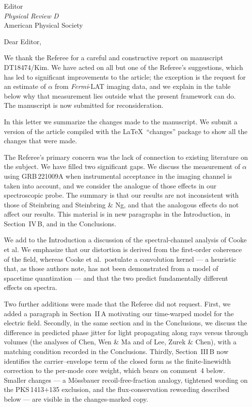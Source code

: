 \documentclass[12pt]{letter}
\begin{document}
\begin{letter}{Editor\\
\textit{Physical Review D}\\
American Physical Society}

\opening{Dear Editor,}

We thank the Referee for a careful and constructive report on manuscript
DT18474/Kim.  We have acted on all but one of the Referee's suggestions,
which has led to significant improvements to the article; the exception is
the request for an estimate of $\alpha$ from \textit{Fermi}-LAT imaging data,
and we explain in the table below why that measurement lies outside what the
present framework can do.  The manuscript is now submitted for
reconsideration.

In this letter we summarize the changes made to the manuscript.  We submit a
version of the article compiled with the \LaTeX\ ``changes'' package to show
all the changes that were made.

The Referee's primary concern was the lack of connection to existing
literature on the subject.  We have filled two significant gaps.  We discuss
the measurement of $\alpha$ using GRB\,221009A when instrumental acceptance
in the imaging channel is taken into account, and we consider the analogue of
those effects in our spectroscopic probe.  The summary is that our results
are not inconsistent with those of Steinbring and Steinbring \& Ng, and that
the analogous effects do not affect our results.  This material is in new
paragraphs in the Introduction, in Section~IV\,B, and in the Conclusions.

We add to the Introduction a discussion of the spectral-channel analysis of
Cooke et al.  We emphasize that our distortion is derived from the
first-order coherence of the field, whereas Cooke et al.\ postulate a
convolution kernel --- a heuristic that, as those authors note, has not been
demonstrated from a model of spacetime quantization --- and that the two
predict fundamentally different effects on spectra.

Two further additions were made that the Referee did not request.  First, we
added a paragraph in Section~II\,A motivating our time-warped model for the
electric field.  Secondly, in the same section and in the Conclusions, we
discuss the difference in predicted phase jitter for light propagating along
rays versus through volumes (the analyses of Chen, Wen \& Ma and of Lee,
Zurek \& Chen), with a matching condition recorded in the Conclusions.
Thirdly, Section~III\,B now identifies the carrier--envelope term of the
closed form as the finite-linewidth correction to the per-mode core weight,
which bears on comment~4 below.
Smaller changes --- a M\"ossbauer recoil-free-fraction analogy, tightened
wording on the PKS\,1413$+$135 exclusion, and the flux-conservation
rewording described below --- are visible in the changes-marked copy.


\end{letter}
\end{document}
